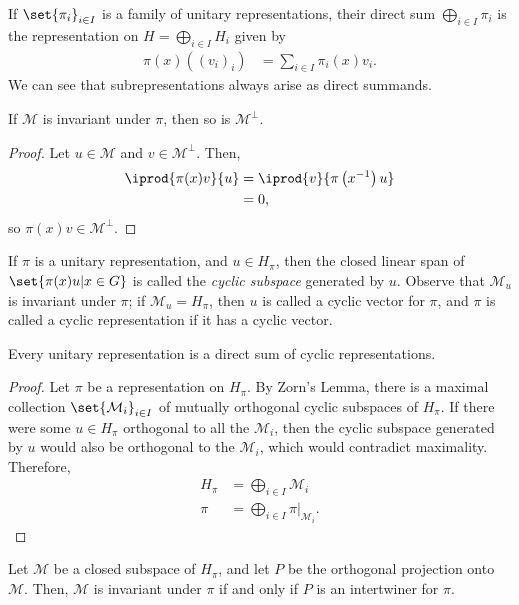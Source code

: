 \documentclass[12pt]{mypackage}
\begin{document}
If $\set{\pi_i}_{i\in I}$ is a family of unitary representations, their direct sum $\bigoplus_{i\in I}\pi_i$ is the representation on $H = \bigoplus_{i\in I}H_i$ given by
\begin{align*}
  \pi(x) \left( \left( v_i \right)_i \right) &= \sum_{i\in I} \pi_i(x)v_i.
\end{align*}
We can see that subrepresentations always arise as direct summands.
\begin{proposition}
  If $\mathcal{M}$ is invariant under $\pi$, then so is $\mathcal{M}^{\perp}$.
\end{proposition}
\begin{proof}
  Let $u\in \mathcal{M}$ and $v\in \mathcal{M}^{\perp}$. Then,
  \begin{align*}
    \iprod{\pi(x)v}{u} &= \iprod{v}{\pi\left( x^{-1} \right)u}\\
                       &= 0,
  \end{align*}
  so $\pi(x)v\in \mathcal{M}^{\perp}$.
\end{proof}
If $\pi$ is a unitary representation, and $u \in H_{\pi}$, then the closed linear span of $\set{\pi(x)u | x\in G}$ is called the \textit{cyclic subspace} generated by $u$. Observe that $\mathcal{M}_{u}$ is invariant under $\pi$; if $\mathcal{M}_u = H_{\pi}$, then $u$ is called a cyclic vector for $\pi$, and $\pi$ is called a cyclic representation if it has a cyclic vector.
\begin{proposition}
  Every unitary representation is a direct sum of cyclic representations.
\end{proposition}
\begin{proof}
  Let $\pi$ be a representation on $H_{\pi}$. By Zorn's Lemma, there is a maximal collection $\set{\mathcal{M}_{i}}_{i\in I}$ of mutually orthogonal cyclic subspaces of $H_{\pi}$. If there were some $u\in H_{\pi}$ orthogonal to all the $\mathcal{M}_i$, then the cyclic subspace generated by $u$ would also be orthogonal to the $\mathcal{M}_i$, which would contradict maximality. Therefore,
  \begin{align*}
    H_{\pi} &= \bigoplus_{i\in I} \mathcal{M}_i\\
    \pi &= \bigoplus_{i\in I}\pi|_{\mathcal{M}_i}.
  \end{align*}
\end{proof}
\begin{proposition}
  Let $\mathcal{M}$ be a closed subspace of $H_{\pi}$, and let $P$ be the orthogonal projection onto $\mathcal{M}$. Then, $\mathcal{M}$ is invariant under $\pi$ if and only if $P$ is an intertwiner for $\pi$.
\end{proposition}
\end{document}

